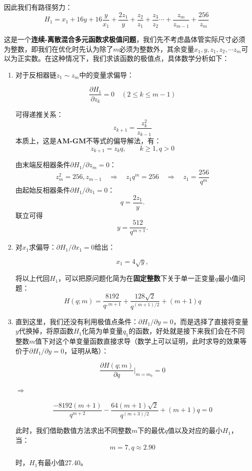 \documentclass[UTF8,12pt,a4paper]{ctexart}
\begin{document}
因此我们有路径努力：
$$H_1 = x_1 + 16y + 16\frac{y}{x_1} + \frac{2z_1}{y} + \frac{z_2}{z_1} + \frac{z_3}{z_2} \cdots + \frac{z_m}{z_{m-1}} + \frac{256}{z_m}$$

这是一个\textbf{连续-离散混合多元函数求极值问题}，我们先不考虑晶体管实际尺寸必须为整数，即我们在优化时先认为除了$m$必须为整数外，其余变量$x_1, y, z_1, z_2, \cdots z_m$可以为正实数。在这种情况下，我们求该函数的极值点，具体数学分析如下：

\begin{enumerate}
    \item 对于反相器链$z_1 \sim z_m$中的变量求偏导：
    
    $$\frac{\partial H_1}{\partial z_k}=0\quad (2\le k\le m-1)$$

    可得递推关系：
    \[
    z_{k+1}=\frac{z_k^2}{z_{k-1}}
    \]
    本质上，这是\textbf{AM-GM}不等式的偏导解法，有：
    \[
    z_{k+1} = z_{k}q, \qquad k \geq 1, q>0
    \]

    由末端反相器条件$\partial H_1/\partial z_m=0$：
    \[
    z_m^2 = 256, z_{m-1}\quad\Rightarrow\quad z_1 q^{m}=256 \quad\Rightarrow\quad z_1=\frac{256}{q^{m}}
    \]
    由起始反相器条件$\partial H_1/\partial z_1=0$：
    \[
    q=\frac{2z_1}{y}.
    \]
    联立可得
    \[
    y=\frac{512}{q^{m+1}}.
    \]

    \item 对$x_1$求偏导：$\partial H_1/\partial x_1=0$给出：
    
    \[
    x_1=4\sqrt{y},
    \]

    将以上代回$H_1$，可以把原问题化简为在\textbf{固定整数}下关于单一正变量$q$最小值问题：
    \[
    H(q;m)=\frac{8192}{q^{,m+1}}+\frac{128\sqrt{2}}{q^{(m+1)/2}}+(m+1)q
    \]

    \item 直到这里，我们还没有利用极值点条件：$\partial H_1/\partial y=0$，而是选择了直接将变量$y$代换掉，将原函数$H_1$化简为单变量$q_1$的函数，好处就是接下来我们会在不同整数$m$值下对这个单变量函数直接求导（数学上可以证明，此时求导的效果等价于$\partial H_1/\partial y=0$，证明从略）：

    $$\frac{\partial H(q;m)}{\partial q}\bigg|_{m=m_0}=0$$

    $\Rightarrow$

    $$\frac{-8192(m+1)}{q^{m+2}} - \frac{64(m+1)\sqrt{2}}{q^{(m+3)/2}} + (m+1)q = 0$$

    此时，我们借助数值方法求出不同整数$m$下的最优$q$值以及对应的最小$H_1$，当：
    $$m = 7, q \approx 2.90$$

    时，$H_{\text{1}}$有最小值27.40。
\end{enumerate}
\end{document}
